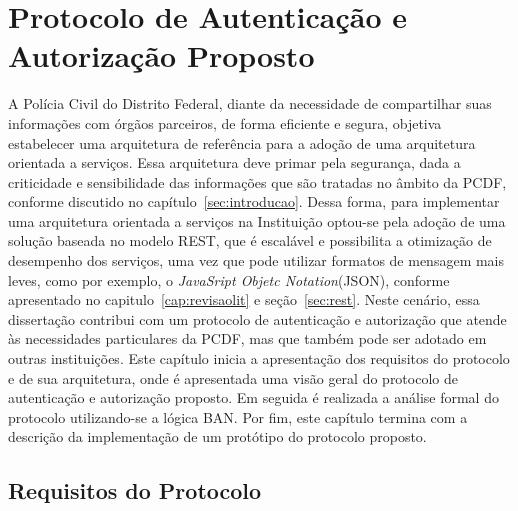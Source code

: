 \chapter{Protocolo de Autenticação e Autorização Proposto}\label{cap:Protocolo}



A Polícia Civil do Distrito Federal, diante da necessidade de compartilhar suas informações com órgãos parceiros, de forma eficiente e segura, objetiva estabelecer uma arquitetura de referência para a adoção de uma arquitetura orientada a serviços. Essa arquitetura deve primar pela segurança, dada a criticidade e sensibilidade das informações que são tratadas no âmbito da PCDF, conforme discutido no capítulo~\ref{sec:introducao}.
Dessa forma, para implementar uma arquitetura orientada a serviços na Instituição optou-se pela adoção de uma solução baseada no modelo REST, que é escalável e possibilita a otimização de desempenho dos serviços, uma vez que pode utilizar formatos de mensagem mais leves, como por exemplo, o \emph{JavaSript Objetc Notation}(JSON), conforme apresentado no capitulo~\ref{cap:revisaolit} e seção~\ref{sec:rest}. Neste cenário, essa dissertação contribui com um protocolo de autenticação e autorização que atende às necessidades particulares da PCDF, mas que também pode ser adotado em outras instituições. Este capítulo inicia a apresentação dos requisitos do protocolo e de sua arquitetura, onde é apresentada uma visão geral do protocolo de autenticação e autorização proposto. Em seguida é realizada a análise formal do protocolo utilizando-se a lógica BAN. Por fim, este capítulo termina com a descrição da implementação de um protótipo do protocolo proposto.


\section{Requisitos do Protocolo}\label{sec:reqprotocolo}

